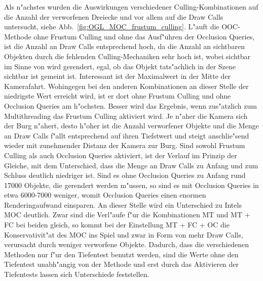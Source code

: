 \documentclass[journal]{vgtc}
\begin{document}
Als n"achstes wurden die Auswirkungen verschiedener Culling-Kombinationen auf die Anzahl der verworfenen Dreiecke und vor allem auf die Draw Calls untersucht, siehe Abb.\ \ref{fig:OGL_MOC_frustum_culling}.
L"auft die OOC-Methode ohne Frustum Culling und ohne das Ausf"uhren der Occlusion Queries, ist die Anzahl an Draw Calls entsprechend hoch, da die Anzahl an sichtbaren Objekten durch die fehlenden Culling-Mechaniken sehr hoch ist, wobei sichtbar im Sinne von \glqq wird gerendert, egal, ob das Objekt tats"achlich in der Szene sichtbar ist\grqq{} gemeint ist.
Interessant ist der Maximalwert in der Mitte der Kamerafahrt.
Wohingegen bei den anderen Kombinationen an dieser Stelle der niedrigste Wert erreicht wird, ist er dort ohne Frustum Culling und ohne Occlusion Queries am h"ochsten.
Besser wird das Ergebnis, wenn zus"atzlich zum Multithreading das Frustum Culling aktiviert wird.
Je n"aher die Kamera sich der Burg n"ahert, desto h"oher ist die Anzahl verworfener Objekte und die Menge an Draw Calls f"allt entsprechend auf ihren Tiefstwert und steigt anschlie"send wieder mit zunehmender Distanz der Kamera zur Burg.
Sind sowohl Frustum Culling als auch Occlusion Queries aktiviert, ist der Verlauf im Prinzip der Gleiche, mit dem Unterschied, dass die Menge an Draw Calls zu Anfang und zum Schluss deutlich niedriger ist.
Sind es ohne Occlusion Queries zu Anfang rund 17000 Objekte, die gerendert werden m"ussen, so sind es mit Occlusion Queries in etwa 6000-7000 weniger, womit Occlusion Queries einen enormen Renderingaufwand einsparen.
An dieser Stelle wird ein Unterschied zu Intels MOC deutlich. Zwar sind die Verl"aufe f"ur die Kombinationen \glqq MT\grqq{} und \glqq MT + FC\grqq{} bei beiden gleich, so kommt bei der Einstellung \glqq MT + FC + OC\grqq{} die Konservativit"at des MOC ins Spiel und zwar in Form von mehr Draw Calls, verursacht durch weniger verworfene Objekte.
Dadurch, dass die verschiedenen Methoden nur f"ur den Tiefentest benutzt werden, sind die Werte ohne den Tiefentest unabh"angig von der Methode und erst durch das Aktivieren der Tiefentests lassen sich Unterschiede feststellen.
		
\end{document}
